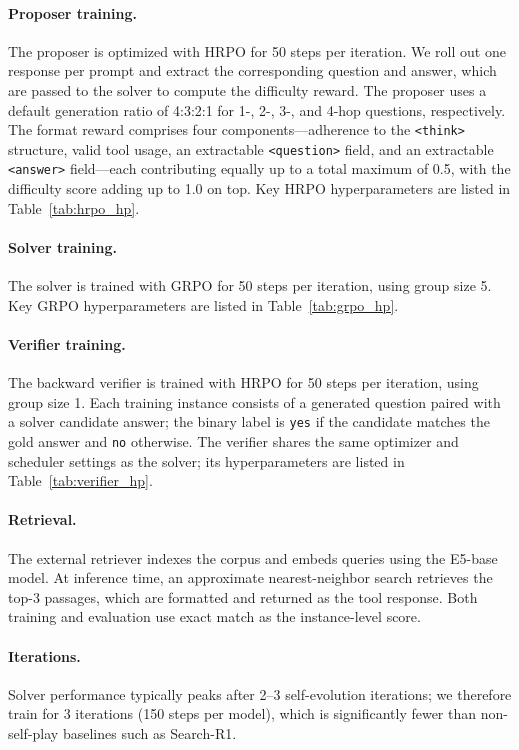 \documentclass{article}
\begin{document}
\paragraph{Proposer training.}
The proposer is optimized with HRPO for 50 steps per iteration.
We roll out one response per prompt and extract the corresponding question and answer, which are passed to the solver to compute the difficulty reward.
The proposer uses a default generation ratio of 4:3:2:1 for 1-, 2-, 3-, and 4-hop questions, respectively.
The format reward comprises four components---adherence to the \texttt{<think>} structure, valid tool usage, an extractable \texttt{<question>} field, and an extractable \texttt{<answer>} field---each contributing equally up to a total maximum of 0.5, with the difficulty score adding up to 1.0 on top.
Key HRPO hyperparameters are listed in Table~\ref{tab:hrpo_hp}.

\paragraph{Solver training.}
The solver is trained with GRPO for 50 steps per iteration, using group size 5.
Key GRPO hyperparameters are listed in Table~\ref{tab:grpo_hp}.

\paragraph{Verifier training.}
The backward verifier is trained with HRPO for 50 steps per iteration, using group size 1.
Each training instance consists of a generated question paired with a solver candidate answer; the binary label is \texttt{yes} if the candidate matches the gold answer and \texttt{no} otherwise.
The verifier shares the same optimizer and scheduler settings as the solver; its hyperparameters are listed in Table~\ref{tab:verifier_hp}.

\paragraph{Retrieval.}
The external retriever indexes the corpus and embeds queries using the E5-base model.
At inference time, an approximate nearest-neighbor search retrieves the top-3 passages, which are formatted and returned as the tool response.
Both training and evaluation use exact match as the instance-level score.

\paragraph{Iterations.}
Solver performance typically peaks after 2--3 self-evolution iterations; we therefore train for 3 iterations (150 steps per model), which is significantly fewer than non-self-play baselines such as Search-R1.
\end{document}
